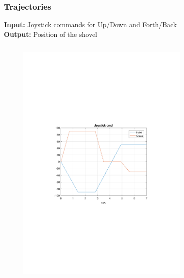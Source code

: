 \begin{frame}[c]
	\frametitle{Trajectories}
	\textbf{Input:} Joystick commands for Up/Down and Forth/Back \\
	\vspace{.4cm}
	\textbf{Output:} Position of the shovel
	\vspace{-.3cm}
	\begin{columns}[T]
		\begin{figure}
			\centering
			\includegraphics[trim=4cm 9cm 4cm 9.5cm, clip=true, width=\linewidth]{img/Joystick}
		\end{figure}
		\begin{figure}
			\centering

\end{figure}
\end{columns}
\end{frame}
